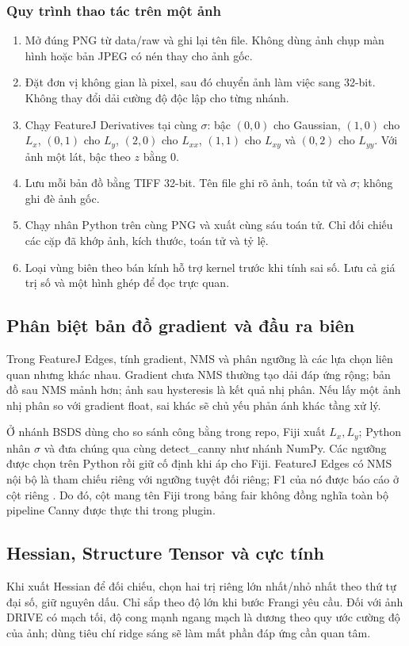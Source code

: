 \subsubsection{Quy trình thao tác trên một ảnh}
\begin{enumerate}
\item Mở đúng PNG từ data/raw và ghi lại tên file. Không dùng ảnh chụp màn hình hoặc bản JPEG có nén thay cho ảnh gốc.
\item Đặt đơn vị không gian là pixel, sau đó chuyển ảnh làm việc sang 32-bit. Không thay đổi dải cường độ độc lập cho từng nhánh.
\item Chạy FeatureJ Derivatives tại cùng $\sigma$: bậc $(0,0)$ cho Gaussian, $(1,0)$ cho $L_x$, $(0,1)$ cho $L_y$, $(2,0)$ cho $L_{xx}$, $(1,1)$ cho $L_{xy}$ và $(0,2)$ cho $L_{yy}$. Với ảnh một lát, bậc theo $z$ bằng 0.
\item Lưu mỗi bản đồ bằng TIFF 32-bit. Tên file ghi rõ ảnh, toán tử và $\sigma$; không ghi đè ảnh gốc.
\item Chạy nhân Python trên cùng PNG và xuất cùng sáu toán tử. Chỉ đối chiếu các cặp đã khớp ảnh, kích thước, toán tử và tỷ lệ.
\item Loại vùng biên theo bán kính hỗ trợ kernel trước khi tính sai số. Lưu cả giá trị số và một hình ghép để đọc trực quan.
\end{enumerate}

\subsection{Phân biệt bản đồ gradient và đầu ra biên}
Trong FeatureJ Edges, tính gradient, NMS và phân ngưỡng là các lựa chọn liên quan nhưng khác nhau. Gradient chưa NMS thường tạo dải đáp ứng rộng; bản đồ sau NMS mảnh hơn; ảnh sau hysteresis là kết quả nhị phân. Nếu lấy một ảnh nhị phân so với gradient float, sai khác sẽ chủ yếu phản ánh khác tầng xử lý.

Ở nhánh BSDS dùng cho so sánh công bằng trong repo, Fiji xuất $L_x,L_y$; Python nhân $\sigma$ và đưa chúng qua cùng detect\_canny như nhánh NumPy. Các ngưỡng được chọn trên Python rồi giữ cố định khi áp cho Fiji. FeatureJ Edges có NMS nội bộ là tham chiếu riêng với ngưỡng tuyệt đối riêng; F1 của nó được báo cáo ở cột riêng \cite{xlaRepository}. Do đó, cột mang tên Fiji trong bảng fair không đồng nghĩa toàn bộ pipeline Canny được thực thi trong plugin.

\subsection{Hessian, Structure Tensor và cực tính}
Khi xuất Hessian để đối chiếu, chọn hai trị riêng lớn nhất/nhỏ nhất theo thứ tự đại số, giữ nguyên dấu. Chỉ sắp theo độ lớn khi bước Frangi yêu cầu. Đối với ảnh DRIVE có mạch tối, độ cong mạnh ngang mạch là dương theo quy ước cường độ của ảnh; dùng tiêu chí ridge sáng sẽ làm mất phần đáp ứng cần quan tâm.

